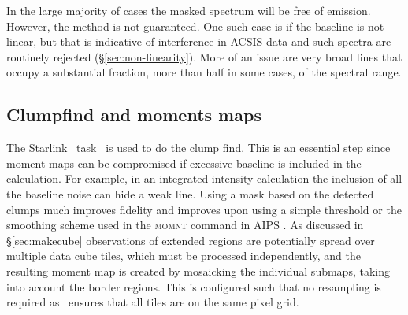 \documentclass[final,authoryear,5p,times,twocolumn]{elsarticle}
\begin{document}
In the large majority of cases the masked spectrum will be free of
emission.  However, the method is not guaranteed.  One such case is if
the baseline is not linear, but that is indicative of interference in
ACSIS data and such spectra are routinely rejected
(\mbox{\S \ref{sec:non-linearity}}).  More of an issue are very broad
lines that occupy a substantial fraction, more than half in some
cases, of the spectral range.

\subsection{Clumpfind and moments maps \label{sec:moment}}

The Starlink \cupid\ task \findclumps\ is used to do the clump
find. This is an essential step since moment maps can be compromised
if excessive baseline is included in the calculation. For example, in an
integrated-intensity calculation the inclusion of all the baseline noise can
hide a weak line.
Using a mask based on the detected clumps much improves
fidelity and improves upon using a simple threshold or
the smoothing scheme used in the \textsc{momnt} command in AIPS
\cite[][]{2003ASSL..285..109G}. As discussed in
\mbox{\S \ref{sec:makecube}}
observations of extended regions are potentially spread over multiple
data cube tiles, which must be processed independently, and the resulting
moment map is created by
mosaicking the individual submaps, taking into account the border
regions. This is configured such that no resampling is required as
\makecube\ ensures that all tiles are on the same pixel grid.
\end{document}
